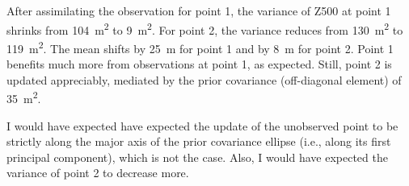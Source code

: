 \documentclass[parskip=half,DIV=16]{scrartcl}
\begin{document}
After assimilating the observation for point 1, the variance of Z500 at point 1 shrinks from \qty{104}{m^2} to \qty{9}{m^2}. For point 2, the variance reduces from \qty{130}{m^2} to \qty{119}{m^2}. The mean shifts by \qty{25}{m} for point 1 and by \qty{8}{m} for point 2. Point 1 benefits much more from observations at point 1, as expected. Still, point 2 is updated appreciably, mediated by the prior covariance (off-diagonal element) of \qty{35}{m^2}.

I would have expected have expected the update of the unobserved point to be strictly along the major axis of the prior covariance ellipse (i.e., along its first principal component), which is not the case. Also, I would have expected the variance of point 2 to decrease more.
\end{document}
